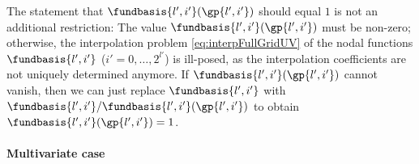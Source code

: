 The statement that $\fundbasis{l',i'}(\gp{l',i'})$ should equal $1$
is not an additional restriction:
The value $\fundbasis{l',i'}(\gp{l',i'})$ must be non-zero;
otherwise, the interpolation problem \eqref{eq:interpFullGridUV}
of the nodal functions $\fundbasis{l',i'}$ ($i' = 0, \dotsc, 2^{l'}$)
is ill-posed, as the interpolation coefficients are not uniquely
determined anymore.
If $\fundbasis{l',i'}(\gp{l',i'})$ cannot vanish,
then we can just replace $\fundbasis{l',i'}$ with
$\fundbasis{l',i'}/\fundbasis{l',i'}(\gp{l',i'})$ to obtain
$\fundbasis{l',i'}(\gp{l',i'}) = 1$.

%

\paragraph{Multivariate case}

